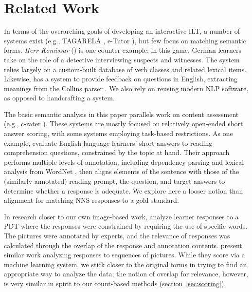 \documentclass[11pt,letterpaper]{article}
\newcommand{\md}[1]{\marginpar{\scriptsize MD: #1}}
\newcommand{\lk}[1]{\marginpar{\scriptsize LK: #1}}
\renewcommand{\marginpar}[1]{}
\begin{document}
\section{Related Work}
In terms of the overarching goals of developing an interactive ILT, a
number of systems exist (e.g., TAGARELA
\citep{Amaral.Meurers.Ziai-11}, e-Tutor \citep{heift:01}), but few
focus on matching semantic forms.  \textit{Herr Komissar}
(\citet{desmedt:95}) is one counter-example; in this game, German learners
take on the role of a detective 
interviewing suspects and witnesses. The system relies largely on a
custom-built database of verb classes and related lexical
items. Likewise, \citet{petersen:10} has a system to provide feedback
on questions in English, extracting meanings from the Collins parser
\citep{collins:99}. We also rely on reusing modern NLP software, as
opposed to handcrafting a system.

The basic semantic analysis in this paper parallels work on content
assessment (e.g., c-rater \citep{leacock:chodorow:03}).  These systems
are mostly focused on relatively open-ended short answer scoring,
with some systems employing task-based restrictions. As one
example, \citet{Meurers.Ziai.ea-11} evaluate English language
learners' short answers to reading comprehension questions,
constrained by the topic at hand. Their approach performs multiple
levels of annotation, including dependency parsing and lexical
analysis from WordNet \citep{Fellbaum:1998}, then aligns elements of
the sentence with those of the (similarly annotated) reading prompt,
the question, and target answers to determine whether a response is
adequate.
We explore here a looser notion than alignment for matching NNS
responses to a gold standard.

In research closer to our own image-based work,
\citet{somasundaran:chodorow:14} analyze learner responses to a PDT
where the responses were constrained by requiring the use of specific
words. The pictures were annotated by experts, and the relevance of
responses was calculated through the overlap of the response and
annotation contents. \citet{somasundaran:ea:15} present similar work
analyzing responses to sequences of pictures.
While they score via a machine learning system, we stick
closer to the original forms in trying to find an appropriate way to
analyze the data; the notion of overlap for relevance, however, is
very similar in spirit to our count-based methods
(section~\ref{sec:scoring}).
%
\end{document}

